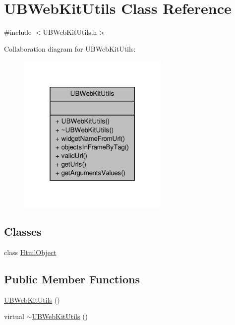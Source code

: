 \hypertarget{class_u_b_web_kit_utils}{\section{U\-B\-Web\-Kit\-Utils Class Reference}
\label{d7/d97/class_u_b_web_kit_utils}
}


{\ttfamily \#include $<$U\-B\-Web\-Kit\-Utils.\-h$>$}



Collaboration diagram for U\-B\-Web\-Kit\-Utils\-:
\nopagebreak
\begin{figure}[H]
\begin{center}
\leavevmode
\includegraphics[width=208pt]{de/d50/class_u_b_web_kit_utils__coll__graph}
\end{center}
\end{figure}
\subsection*{Classes}
\begin{DoxyCompactItemize}
\item 
class \hyperlink{class_u_b_web_kit_utils_1_1_html_object}{Html\-Object}
\end{DoxyCompactItemize}
\subsection*{Public Member Functions}
\begin{DoxyCompactItemize}
\item 
\hyperlink{class_u_b_web_kit_utils_afeec09ddafb55f5d2fd6d40a18223851}{U\-B\-Web\-Kit\-Utils} ()
\item 
virtual \hyperlink{class_u_b_web_kit_utils_a0588b45de5f56a9d6f28eb0ff48cf88b}{$\sim$\-U\-B\-Web\-Kit\-Utils} ()
\end{DoxyCompactItemize}
